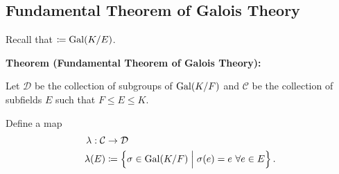 \begin{center}

\end{center}

\hypertarget{fundamental-theorem-of-galois-theory}{%
\subsection{Fundamental Theorem of Galois
Theory}\label{fundamental-theorem-of-galois-theory}}

Recall that \(\coloneqq \mathrm{Gal}(K/E)\).

\textbf{Theorem (Fundamental Theorem of Galois Theory):}

Let \(\mathcal D\) be the collection of subgroups of \(\mathrm{Gal}(K/F)\) and
\(\mathcal C\) be the collection of subfields \(E\) such that
\(F \leq E \leq K\).

Define a map \begin{align*}
\lambda: \mathcal C &\to \mathcal D \\
\lambda(E) &\coloneqq \left\{{\sigma \in \mathrm{Gal}(K/F) \mathrel{\Big|} \sigma(e) = e ~\forall e\in E}\right\}
.\end{align*}


